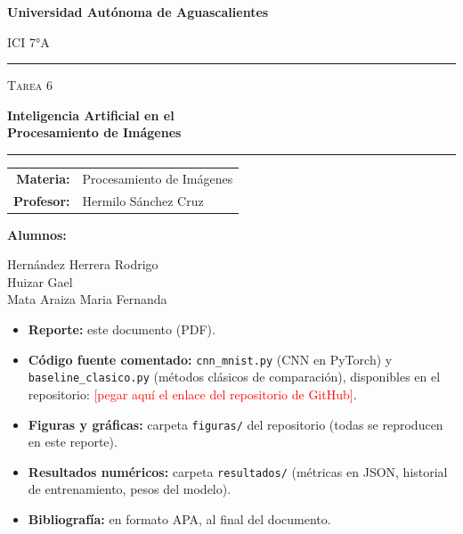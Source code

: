 \documentclass[11pt,letterpaper]{article}
\newcommand{\Repositorio}{\textcolor{red}{[pegar aquí el enlace del repositorio de GitHub]}}
\begin{document}
\begin{titlepage}
  \thispagestyle{empty}
  \centering
  \vspace*{0.5cm}
  {\LARGE\bfseries Universidad Autónoma de Aguascalientes\par}
  \vspace{0.6cm}
  {\Large ICI 7°A\par}
  \vspace{3.2cm}
  {\color{azul}\rule{\linewidth}{1.2pt}}\par\vspace{0.5cm}
  {\large\scshape Tarea 6\par}\vspace{0.3cm}
  {\huge\bfseries Inteligencia Artificial en el\\[0.15cm] Procesamiento de Imágenes\par}
  \vspace{0.4cm}
  {\color{azul}\rule{\linewidth}{1.2pt}}\par
  \vspace{2.2cm}
  {\large
  \begin{tabular}{rl}
    \textbf{Materia:}  & Procesamiento de Imágenes \\[0.25cm]
    \textbf{Profesor:} & Hermilo Sánchez Cruz \\
  \end{tabular}\par}
  \vfill
  {\large\textbf{Alumnos:}\par}
  \vspace{0.3cm}
  {\large
  Hernández Herrera Rodrigo\\[0.15cm]
  Huizar Gael\\[0.15cm]
  Mata Araiza Maria Fernanda\par}
  \vspace*{1.5cm}
\end{titlepage}

\setcounter{page}{2}
\tableofcontents
\vspace{0.6cm}
\begin{tcolorbox}[colback=grisclaro,colframe=black!15,boxrule=0.4pt,arc=1pt,title={\bfseries Entregables},coltitle=black,colbacktitle=black!8]
\begin{itemize}[leftmargin=1.2em]
  \item \textbf{Reporte:} este documento (PDF).
  \item \textbf{Código fuente comentado:} \texttt{cnn\_mnist.py} (CNN en PyTorch) y \texttt{baseline\_clasico.py} (métodos clásicos de comparación), disponibles en el repositorio: \Repositorio.
  \item \textbf{Figuras y gráficas:} carpeta \texttt{figuras/} del repositorio (todas se reproducen en este reporte).
  \item \textbf{Resultados numéricos:} carpeta \texttt{resultados/} (métricas en JSON, historial de entrenamiento, pesos del modelo).
  \item \textbf{Bibliografía:} en formato APA, al final del documento.
\end{itemize}
\end{tcolorbox}
\end{document}
